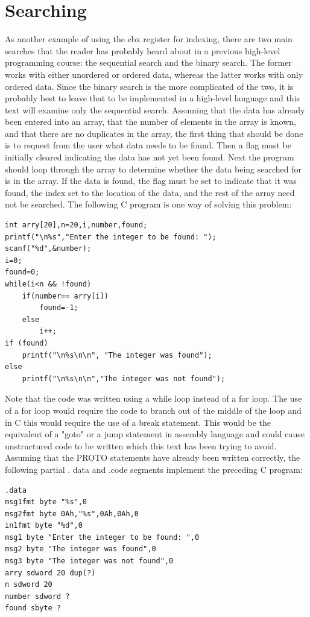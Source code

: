 \documentclass[10pt]{book}
\begin{document}
\section{Searching}
As another example of using the ebx register for indexing, there are two main searches that the reader has probably heard about in a previous high-level programming course: the sequential search and the binary search. The former works with either unordered or ordered data, whereas the latter works with only ordered data. Since the binary search is the more complicated of the two, it is probably best to leave that to be implemented in a high-level language and this text will examine only the sequential search.
Assuming that the data has already been entered into an array, that the number of elements in the array is known, and that there are no duplicates in the array, the first thing that should be done is to request from the user what data needs to be found. Then a flag must be initially cleared indicating the data has not yet been found. Next the program should loop through the array to determine whether the data being searched for is in the array. If the data is found, the flag must be set to indicate that it was found, the index set to the location of the data, and the rest of the array need not be searched. The following C program is one way of solving this problem:

\begin{verbatim}
int arry[20],n=20,i,number,found;
printf("\n%s","Enter the integer to be found: ");
scanf("%d",&number);
i=0;
found=0;
while(i<n && !found)
    if(number== arry[i])
        found=-1;
    else
        i++;
if (found)
    printf("\n%s\n\n", "The integer was found");
else
    printf("\n%s\n\n","The integer was not found");
\end{verbatim}

Note that the code was written using a while loop instead of a for loop. The use of a for loop would require the code to branch out of the middle of the loop and in C this would require the use of a break statement. This would be the equivalent of a "goto" or a jump statement in assembly language and could cause unstructured code to be written which this text has been trying to avoid. Assuming that the PROTO statements have already been written correctly, the following partial . data and .code segments implement the preceding C program:

\begin{verbatim}
.data
msg1fmt byte "%s",0
msg2fmt byte 0Ah,"%s",0Ah,0Ah,0
in1fmt byte "%d",0
msg1 byte "Enter the integer to be found: ",0
msg2 byte "The integer was found",0
msg3 byte "The integer was not found",0
arry sdword 20 dup(?)
n sdword 20
number sdword ?
found sbyte ?
\end{verbatim}
\end{document}
